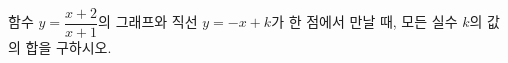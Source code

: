 \hspace*{2mm}\begin{minipage}[t]{\dimexpr\linewidth-2mm\relax}\vspace{0pt}
함수 $y=\dfrac{x+2}{x+1}$의 그래프와 직선 $y=-x+k$가 한 점에서 만날 때, 모든 실수 $k$의 값의 합을 구하시오.\end{minipage}
